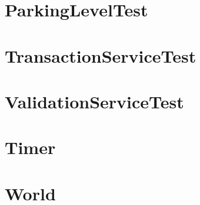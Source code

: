 \documentclass{article}
\begin{document}
\section{ParkingLevelTest}

\section{TransactionServiceTest}

\section{ValidationServiceTest}

\section{Timer}

\section{World}

\end{document}
